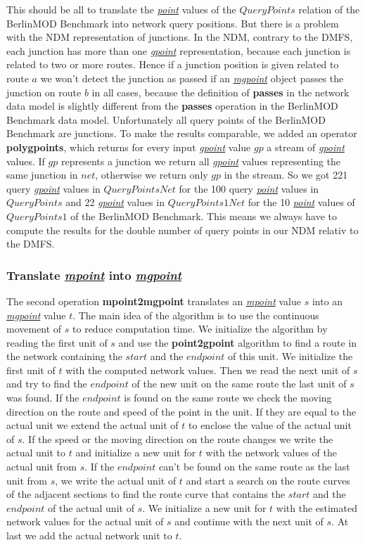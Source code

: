 \documentclass[a4paper]{article}
\newcommand{\bmodb} {BerlinMOD Benchmark}
\newcommand{\op}[1]{\textbf{#1}}
\newcommand{\dt}[1]{\textsl{\underline{#1}}}
\begin{document}
{This should be all to translate the \dt{point} values of the $QueryPoints$
relation of the \bmodb{} into network query positions. But there is a problem with
the NDM representation of junctions. In the NDM, contrary to the DMFS, each junction
has more than one \dt{gpoint} representation, because each junction is related to
two or more routes. Hence if a junction position is given related to route $a$
we won't detect the junction as passed if an \dt{mgpoint} object passes the junction
on route $b$ in all cases, because the definition of \op{passes} in the network
data model is slightly different from the \op{passes} operation in the \bmodb{} data model.
Unfortunately all query points of the \bmodb{} are junctions. To make the results
comparable, we added an operator \op{polygpoints}, which returns for every input
\dt{gpoint} value $gp$ a stream of \dt{gpoint} values. If $gp$ represents a junction
we return all \dt{gpoint} values representing the same junction in $net$,
otherwise we return only $gp$ in the stream. So we got 221 query \dt{gpoint}
values in $QueryPointsNet$ for the 100 query \dt{point} values in
$QueryPoints$ and 22 \dt{gpoint} values in $QueryPoints1Net$ for the
10 \dt{point} values of $QueryPoints1$ of the \bmodb{}. This means we always have
to compute the results for the double number of query points in our NDM relativ
to the DMFS.
\subsubsection{Translate \dt{mpoint} into \dt{mgpoint}}
The second operation \op{mpoint2mgpoint} translates an \dt{mpoint} value $s$
into an \dt{mgpoint} value $t$. The main idea of the algorithm is to use the
continuous movement of $s$ to reduce computation time. We initialize the
algorithm by reading the first unit of $s$ and use the \op{point2gpoint}
algorithm to find a route in the network containing the $start$ and
the $end point$ of this unit. We initialize the first unit of $t$ with
the computed network values. Then we read the next unit of $s$ and try to find
the $end point$ of the new unit on the same route the last unit of $s$ was
found. If the $end point$ is found on the same route we check the moving direction
on the route and speed of the point in the unit. If they are equal to the actual unit we extend
the actual unit of $t$ to enclose the value of the actual unit of $s$. If the
speed or the moving direction on the route changes we write the actual unit to $t$ and initialize
a new unit for $t$ with the network values of the actual unit from $s$.
If the $end point$ can't be found on the same route as the last unit from
$s$, we write the actual unit of $t$ and start a search on the route curves
of the adjacent sections to find the route curve that contains the $start$
and the $end point$ of the actual unit of $s$. We initialize a new unit
for $t$ with the estimated network values for the actual unit of $s$ and
continue with the next unit of $s$. At last we add the actual network unit
to $t$.

}
\end{document}
